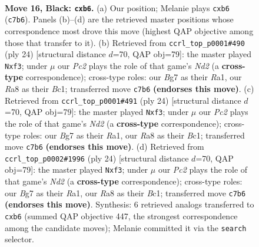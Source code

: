 \documentclass[11pt]{article}
\begin{document}
\clearpage

\begin{figure}[p]\centering
\begin{subfigure}{0.46\textwidth}\centering
\resizebox{\linewidth}{!}{%
\newchessgame
\chessboard[
  setfen={rn1rn1k1/p1p2pbp/PP2b1p1/1P2p3/4P2P/2N2N2/4BPP1/R1B1K2R b KQ - 0 16},
  showmover=false,
  pgfstyle=straightmove, color=movearrow, markmove={c7-b6}
]}
\caption{}
\end{subfigure}\hfill
\begin{subfigure}{0.46\textwidth}\centering
\resizebox{\linewidth}{!}{%
\newchessgame
\chessboard[
  setfen={r2k1b1r/ppp3pp/2n1bn2/3p4/3P4/2P1Np2/PP1N2PP/R1B1KB1R w KQ - 0 13},
  showmover=false,
  pgfstyle=straightmove, color=movearrow, markmove={d2-f3}
]}
\caption{}
\end{subfigure}
\\[4pt]
\begin{subfigure}{0.46\textwidth}\centering
\resizebox{\linewidth}{!}{%
\newchessgame
\chessboard[
  setfen={r2k1b1r/ppp3pp/2n1bn2/3p4/3P4/2P1Np2/PP1N2PP/R1B1KB1R w KQ - 0 13},
  showmover=false,
  pgfstyle=straightmove, color=movearrow, markmove={d2-f3}
]}
\caption{}
\end{subfigure}\hfill
\begin{subfigure}{0.46\textwidth}\centering
\resizebox{\linewidth}{!}{%
\newchessgame
\chessboard[
  setfen={r2k1b1r/ppp3pp/2n1bn2/3p4/3P4/2P1Np2/PP1N2PP/R1B1KB1R w KQ - 0 13},
  showmover=false,
  pgfstyle=straightmove, color=movearrow, markmove={d2-f3}
]}
\caption{}
\end{subfigure}
\caption{\textbf{Move 16, Black: \texttt{cxb6}.} (a) Our position; Melanie plays \texttt{cxb6} (\texttt{c7b6}). Panels (b)--(d) are the retrieved master positions whose correspondence most drove this move (highest QAP objective among those that transfer to it). (b) Retrieved from \texttt{ccrl\_top\_p0001\#490} (ply 24) [structural distance $d$=70, QAP obj=79]: the master played \texttt{Nxf3}; under $\mu$ our \emph{Pc2} plays the role of that game's \emph{Nd2} (a \textbf{cross-type} correspondence); cross-type roles: our \emph{B}g7 as their \emph{R}a1, our \emph{R}a8 as their \emph{B}c1; transferred move \texttt{c7b6} \textbf{(endorses this move)}. (c) Retrieved from \texttt{ccrl\_top\_p0001\#491} (ply 24) [structural distance $d$=70, QAP obj=79]: the master played \texttt{Nxf3}; under $\mu$ our \emph{Pc2} plays the role of that game's \emph{Nd2} (a \textbf{cross-type} correspondence); cross-type roles: our \emph{B}g7 as their \emph{R}a1, our \emph{R}a8 as their \emph{B}c1; transferred move \texttt{c7b6} \textbf{(endorses this move)}. (d) Retrieved from \texttt{ccrl\_top\_p0002\#1996} (ply 24) [structural distance $d$=70, QAP obj=79]: the master played \texttt{Nxf3}; under $\mu$ our \emph{Pc2} plays the role of that game's \emph{Nd2} (a \textbf{cross-type} correspondence); cross-type roles: our \emph{B}g7 as their \emph{R}a1, our \emph{R}a8 as their \emph{B}c1; transferred move \texttt{c7b6} \textbf{(endorses this move)}. Synthesis: 6 retrieved analogs transferred to \texttt{cxb6} (summed QAP objective 447, the strongest correspondence among the candidate moves); Melanie committed it via the \texttt{search} selector.}

\end{figure}
\end{document}
